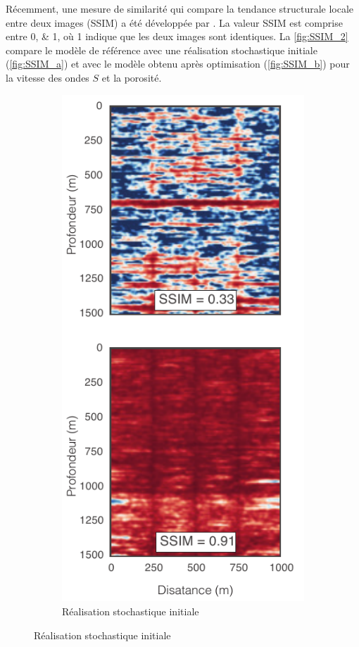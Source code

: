 Récemment, une mesure de similarité qui compare la tendance structurale locale
entre deux images (SSIM) a été développée par \citet{Wang2004}. La valeur SSIM
est comprise entre \numlist{0;1}, où \num{1} indique que les deux images sont
identiques. La \cref{fig:SSIM_2} compare le modèle de référence avec une
réalisation stochastique initiale (\cref{fig:SSIM_a}) et avec le modèle obtenu
après optimisation (\cref{fig:SSIM_b}) pour la vitesse des ondes $S$ et la
porosité.
\begin{figure}[!ht]
        \centering
        \begin{subfigure}[b]{0.35\textwidth}
                \caption{Réalisation stochastique initiale}
                \includegraphics[width=\textwidth]{fig/SSIM_2_a.pdf}

\end{subfigure}
\end{figure}
